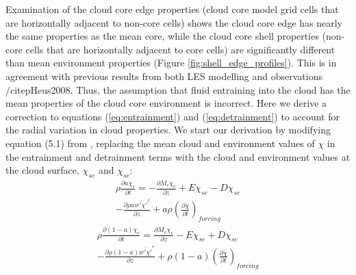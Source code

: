 \documentclass[12pt]{article}
\begin{document}
Examination of the cloud core edge properties (cloud core model grid cells 
that are horizontally adjacent to non-core cells) shows the cloud core edge has 
nearly the same properties as the mean core, while the cloud core shell 
properties (non-core cells that are horizontally adjacent to core cells) 
are significantly different than mean environment properties (Figure 
\ref{fig:shell_edge_profiles}).  This is in agreement with previous results 
from both LES modelling and observations /citep{Heus2008}.  Thus, the 
assumption that fluid entraining into the cloud has the mean properties of the 
cloud core environment is incorrect.  Here we derive a correction to equations 
(\ref{eq:entrainment}) and (\ref{eq:detrainment}) to account for the radial 
variation in cloud properties. We start our derivation by modifying equation 
(5.1) from \cite{Siebesma1995}, replacing the mean cloud and environment values 
of $\chi$ in the entrainment and detrainment terms with the cloud and 
environment values at the cloud surface, $\chi_{se}$ and $\chi_{sc}$:
\begin{equation}
  \label{eq:derivation_entrainment}
  \begin{split}
    \rho \frac{\partial a \chi_c}{\partial t} 
    = - \frac{\partial M_c \chi_c}{\partial z} 
    + E \chi_{se} - D \chi_{sc} \\
    - \frac{\partial \rho a \overline{w' \chi'}^c}{\partial z} 
    + a \rho \left(\frac{\partial \bar{\chi}}{\partial t}\right)_{forcing}
  \end{split}
\end{equation}
\begin{equation}
  \label{eq:derivation_detrainment}
  \begin{split}
    \rho \frac{\partial (1 - a) \chi_e}{\partial t}
    = \frac{\partial M_c \chi_e}{\partial z} 
    - E \chi_{se} + D \chi_{sc} \\
    - \frac{\partial \rho (1 - a) \overline{w' \chi'}^e}{\partial z} 
    + \rho (1 - a) \left(\frac{\partial \bar{\chi}}{\partial t}\right)_{forcing}
  \end{split}
\end{equation}
\end{document}
